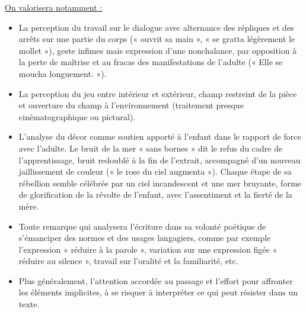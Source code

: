 {\underline{On valorisera notamment :}

\begin{itemize}
\item La perception du travail sur le dialogue avec alternance des répliques et des
arrêts sur une partie du corps (« ouvrit sa main », « se gratta légèrement le
mollet »), geste infimes mais expression d’une nonchalance, par opposition à
la perte de maîtrise et au fracas des manifestations de l’adulte (« Elle se
moucha longuement. »).

\item La perception du jeu entre intérieur et extérieur, champ restreint de la pièce et
ouverture du champ à l’environnement (traitement presque cinématographique
ou pictural).

\item L’analyse du décor comme soutien apporté à l’enfant dans le rapport de force
avec l’adulte. Le bruit de la mer « sans bornes » dit le refus du cadre de
l’apprentissage, bruit redoublé à la fin de l’extrait, accompagné d’un nouveau
jaillissement de couleur (« le rose du ciel augmenta »). Chaque étape de sa
rébellion semble célébrée par un ciel incandescent et une mer bruyante, forme
de glorification de la révolte de l’enfant, avec l’assentiment et la fierté de la
mère.

\item Toute remarque qui analysera l’écriture dans sa volonté poétique de
s’émanciper des normes et des usages langagiers, comme par exemple
l’expression « réduire à la parole », variation sur une expression figée « réduire
au silence », travail sur l’oralité et la familiarité, etc.

\item Plus généralement, l’attention accordée au passage et l’effort pour affronter les
éléments implicites, à se risquer à interpréter ce qui peut résister dans un texte.
\end{itemize}
}%
